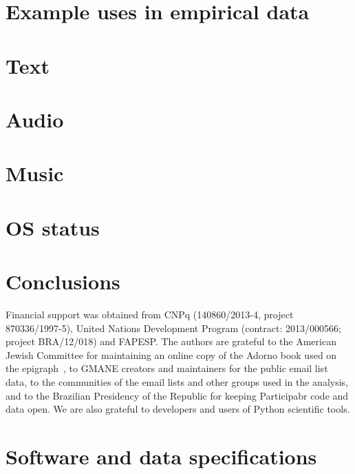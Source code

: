\documentclass[%
	aip,
	jmp,%
	amsmath,amssymb,
	reprint,%
]{revtex4-1}
\begin{document}
\section{Example uses in empirical data}\label{sec:empirical}


\section{Text}





\section{Audio}



\section{Music}



\section{OS status}



\section{Conclusions}\label{sec:conc}
\begin{acknowledgments}
	Financial support was obtained from CNPq (140860/2013-4,
	project 870336/1997-5), United Nations Development Program (contract: 2013/000566; project BRA/12/018) and FAPESP. 
	The authors are grateful to the American Jewish Committee for maintaining an online copy of the Adorno book used on the epigraph~\cite{adorno}, to GMANE creators and maintainers for the public email list data, to the communities of the email lists and other groups used in the analysis, and to the Brazilian Presidency of the Republic for keeping Participabr code and data open.
	We are also grateful to developers and users of Python scientific tools.
\end{acknowledgments}


\appendix
\section{Software and data specifications}\label{ap:soft}


\end{document}
